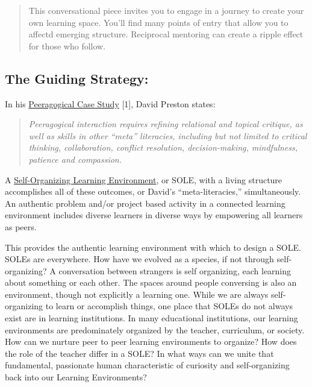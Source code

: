 \begin{quote}
This conversational piece invites you to engage in a journey to create
your own learning space. You'll find many points of entry that allow you
to affectd emerging structure. Reciprocal mentoring can create a ripple
effect for those who follow.
\end{quote}

\hypertarget{the-guiding-strategy}{%
\subsection{The Guiding Strategy:}\label{the-guiding-strategy}}

In his \href{http://peeragogy.org/case-study-5ph1nx/}{Peeragogical Case
Study} {{[}1{]}}, David Preston states:

\begin{quote}
\emph{Peeragogical interaction requires refining relational and topical
critique, as well as skills in other ``meta'' literacies, including but
not limited to critical thinking, collaboration, conflict resolution,
decision-making, mindfulness, patience and compassion.}
\end{quote}

A
\href{http://en.wikipedia.org/wiki/Self_Organised_Learning_Environment}{Self-Organizing
Learning Environment}, or SOLE, with a living structure accomplishes all
of these outcomes, or David's ``meta-literacies,'' simultaneously. An
authentic problem and/or project based activity in a connected learning
environment includes diverse learners in diverse ways by empowering all
learners as peers.

This provides the authentic learning environment with which to design a
SOLE. SOLEs are everywhere. How have we evolved as a species, if not
through self-organizing? A conversation between strangers is self
organizing, each learning about something or each other. The spaces
around people conversing is also an environment, though not explicitly a
learning one. While we are always self-organizing to learn or accomplish
things, one place that SOLEs do not always exist are in learning
institutions. In many educational institutions, our learning
environments are predominately organized by the teacher, curriculum, or
society. How can we nurture peer to peer learning environments to
organize? How does the role of the teacher differ in a SOLE? In what
ways can we unite that fundamental, passionate human characteristic of
curiosity and self-organizing back into our Learning Environments?


